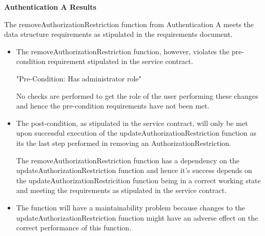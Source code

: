 \textbf{Authentication A Results} \newline

The removeAuthorizationRestriction function from Authentication A meets
the data structure requirements as stipulated in the requirements document.

\begin{itemize}
\item The removeAuthorizationRestriction function, however, violates the pre-condition
requirement stipulated in the service contract.

  "Pre-Condition: Has administrator role"

No checks are performed to get the role of the user performing these changes and hence
the pre-condition requirements have not been met.

\item The post-condition, as stipulated in the service contract, will only be met upon successful execution 
of the updateAuthorizationRestriction function as its the last step performed in removing an AuthorizationRestriction.

The removeAuthorizationRestriction function has a dependency on the updateAuthorizationRestriction function
and hence it's success depends on the updateAuthorizationRestricition function being in a correct working state and
meeting the requirements as stipulated in the service contract.

\item The function will have a maintainability problem because changes to the updateAuthorizationRestriction function 
might have an adverse effect on the correct performance of this function.
\end{itemize}
